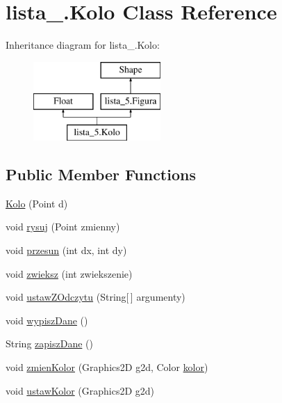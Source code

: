 \hypertarget{classlista__5_1_1_kolo}{}\section{lista\+\_.\+Kolo Class Reference}
\label{classlista__5_1_1_kolo}
Inheritance diagram for lista\+\_.\+Kolo\+:\begin{figure}[H]
\begin{center}
\leavevmode
\includegraphics[height=3.000000cm]{classlista__5_1_1_kolo}
\end{center}
\end{figure}
\subsection*{Public Member Functions}
\begin{DoxyCompactItemize}
\item 
\mbox{\hyperlink{classlista__5_1_1_kolo_abbb4dd96b93d0ea773221a321e4af943}{Kolo}} (Point d)
\item 
void \mbox{\hyperlink{classlista__5_1_1_kolo_acf743c21951288b8794d613665048610}{rysuj}} (Point zmienny)
\item 
void \mbox{\hyperlink{classlista__5_1_1_kolo_ab984e23d3e45dd5a63dfccf6aeaae01a}{przesun}} (int dx, int dy)
\item 
void \mbox{\hyperlink{classlista__5_1_1_kolo_a045124cf2c42238baba9ba097c2f5af2}{zwieksz}} (int zwiekszenie)
\item 
void \mbox{\hyperlink{classlista__5_1_1_kolo_ad4c6dbc8f29699d8753272098719186e}{ustaw\+Z\+Odczytu}} (String\mbox{[}$\,$\mbox{]} argumenty)
\item 
void \mbox{\hyperlink{classlista__5_1_1_kolo_a9b453810cf6823d1f2549f85419aa5a7}{wypisz\+Dane}} ()
\item 
String \mbox{\hyperlink{classlista__5_1_1_kolo_ab812bc5ce875bf87c7c4268d4f1c8aa2}{zapisz\+Dane}} ()
\item 
void \mbox{\hyperlink{classlista__5_1_1_kolo_af4a5e91767dcc103808fb63f39b7404a}{zmien\+Kolor}} (Graphics2D g2d, Color \mbox{\hyperlink{classlista__5_1_1_kolo_ae42f8858e1a2278cc04b3190a2ee9fcb}{kolor}})
\item 
void \mbox{\hyperlink{classlista__5_1_1_kolo_a97e188acce92c4ca26f1e5483370b00f}{ustaw\+Kolor}} (Graphics2D g2d)
\end{DoxyCompactItemize}

